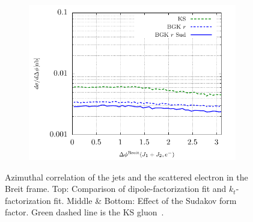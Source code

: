 \documentclass[12pt]{article}
\numberwithin{equation}{section}
\numberwithin{table}{section}
\numberwithin{figure}{section}
\begin{document}
\begin{figure}[p]
\begin{subfigure}{0.5\textwidth}
	\end{subfigure}
	\begin{subfigure}{0.5\textwidth}
	\includegraphics[width=\textwidth]{plots/plotBGK3}
	\end{subfigure}
	\caption{\footnotesize Azimuthal correlation of the jets and the scattered electron in the Breit frame. Top: Comparison of dipole-factorization fit and $k_t$-factorization fit. Middle \& Bottom: Effect of the Sudakov form factor.   Green dashed line is the KS gluon~\cite{vanHameren:2021sqc}.}
	\label{fig:je-breit}
\end{figure}
\end{document}

